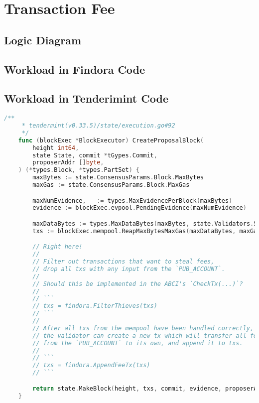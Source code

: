 \section{Transaction Fee}

\subsection{Logic Diagram}

\subsection{Workload in Findora Code}

\subsection{Workload in Tenderimint Code} \label{tendermint:CreateProposalBlock}

\begin{lstlisting}[language=go]
    /**
     * tendermint(v0.33.5)/state/execution.go#92
     */
    func (blockExec *BlockExecutor) CreateProposalBlock(
        height int64,
        state State, commit *tGypes.Commit,
        proposerAddr []byte,
    ) (*types.Block, *types.PartSet) {
        maxBytes := state.ConsensusParams.Block.MaxBytes
        maxGas := state.ConsensusParams.Block.MaxGas

        maxNumEvidence, _ := types.MaxEvidencePerBlock(maxBytes)
        evidence := blockExec.evpool.PendingEvidence(maxNumEvidence)

        maxDataBytes := types.MaxDataBytes(maxBytes, state.Validators.Size(), len(evidence))
        txs := blockExec.mempool.ReapMaxBytesMaxGas(maxDataBytes, maxGas)

        // Right here!
        //
        // Filter out transactions that want to steal fees,
        // drop all txs with any input from the `PUB_ACCOUNT`.
        //
        // Should this be implemented in the ABCI's `CheckTx(...)`?
        //
        // ```
        // txs = findora.FilterThieves(txs)
        // ```
        //
        // After all txs from the mempool have been handled correctly,
        // the validator can create a new tx which will transfer all fees
        // from the `PUB_ACCOUNT` to its own, and append it to txs.
        //
        // ```
        // txs = findora.AppendFeeTx(txs)
        // ```

        return state.MakeBlock(height, txs, commit, evidence, proposerAddr)
    }
\end{lstlisting}
